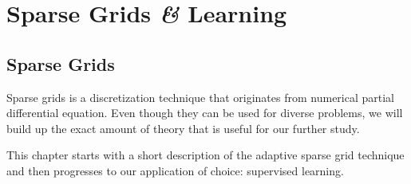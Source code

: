 \chapter{Sparse Grids \textit{\&} Learning}

\section{Sparse Grids}
Sparse grids is a discretization technique that originates from numerical
partial differential equation.
Even though they can be used for diverse problems, we will build up
the exact amount of theory that is useful for our further study.

This chapter starts with a short description of the adaptive sparse grid
technique and then progresses to our application of choice: supervised learning.

